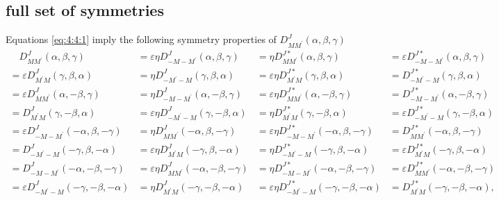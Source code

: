 \subsection{full set of symmetries}
Equations \eqref{eq:4:4:1} imply the following symmetry properties of $D_{M M^{\prime}}^{J}(\alpha, \beta, \gamma)$
\begin{equation}
  \renewcommand{\arraycolsep}{0pt}
\begin{array}{llll}
\quad D_{M M^{\prime}}^{J}(\alpha, \beta, \gamma) & =\varepsilon \eta D_{-M-M^{\prime}}^{J}(\alpha, \beta, \gamma) & =\eta D_{M M^{\prime}}^{J *}(\alpha, \beta, \gamma) & =\varepsilon D_{-M-M^{\prime}}^{J *}(\alpha, \beta, \gamma) \\
=\varepsilon D_{M^{\prime} M}^{J}(\gamma, \beta, \alpha) & =\eta D_{-M^{\prime}-M}^{J}(\gamma, \beta, \alpha) & =\varepsilon \eta D_{M^{\prime} M}^{J *}(\gamma, \beta, \alpha) & =D_{-M^{\prime}-M}^{J *}(\gamma, \beta, \alpha) \\
=\varepsilon D_{M M^{\prime}}^{J}(\alpha,-\beta, \gamma) & =\eta D_{-M-M^{\prime}}^{J}(\alpha,-\beta, \gamma) & =\varepsilon \eta D_{M M^{\prime}}^{J *}(\alpha,-\beta, \gamma) & =D_{-M-M^{\prime}}^{J *}(\alpha,-\beta, \gamma) \\
=D_{M^{\prime} M}^{J}(\gamma,-\beta, \alpha) & =\varepsilon \eta D_{-M^{\prime}-M}^{J}(\gamma,-\beta, \alpha) & =\eta D_{M^{\prime} M}^{J *}(\gamma,-\beta, \alpha) & =\varepsilon D_{-M^{\prime}-M}^{J *}(\gamma,-\beta, \alpha) \\
=\varepsilon D_{-M-M^{\prime}}^{J}(-\alpha, \beta,-\gamma) & =\eta D_{M M^{\prime}}^{J}(-\alpha, \beta,-\gamma) & =\varepsilon \eta D_{-M-M^{\prime}}^{J *}(-\alpha, \beta,-\gamma) & =D_{M M^{\prime}}^{J *}(-\alpha, \beta,-\gamma) \\
=D_{-M^{\prime}-M}^{J}(-\gamma, \beta,-\alpha) & =\varepsilon \eta D_{M^{\prime} M}^{J}(-\gamma, \beta,-\alpha) & =\eta D_{-M^{\prime}-M}^{J *}(-\gamma, \beta,-\alpha) & =\varepsilon D_{M^{\prime} M}^{J *}(-\gamma, \beta,-\alpha) \\
=D_{-M-M^{\prime}}^{J}(-\alpha,-\beta,-\gamma) & =\varepsilon \eta D_{M M^{\prime}}^{J}(-\alpha,-\beta,-\gamma) & =\eta D_{-M-M^{\prime}}^{J *}(-\alpha,-\beta,-\gamma) & =\varepsilon D_{M M^{\prime}}^{J *}(-\alpha,-\beta,-\gamma) \\
=\varepsilon D_{-M^{\prime}-M}^{J}(-\gamma,-\beta,-\alpha) & =\eta D_{M^{\prime} M}^{J}(-\gamma,-\beta,-\alpha) & =\varepsilon \eta D_{-M^{\prime}-M}^{J *}(-\gamma,-\beta,-\alpha) & =D_{M^{\prime} M}^{J *}(-\gamma,-\beta,-\alpha),
\end{array}
\end{equation}
